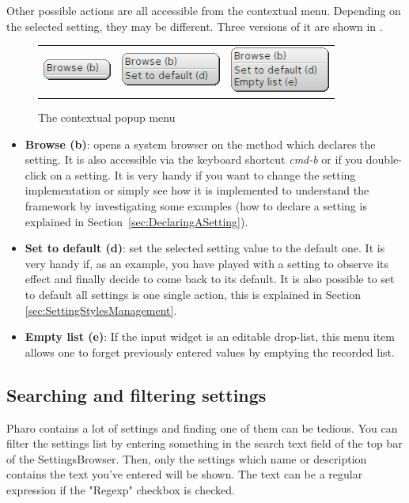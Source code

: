 \documentclass[a4paper,10pt,twoside]{book}
\begin{document}
Other possible actions are all accessible from the contextual menu.
Depending on the selected setting, they may be different. Three versions of it are shown in .
\begin{figure}[tbh]
\begin{center}
\begin{tabular}{ccc}
\includegraphics[scale=0.5]{popup0.png} & 
	\includegraphics[scale=0.5]{popup1.png} & 
	\includegraphics[scale=0.5]{popup2.png} \\ 
\end{tabular} 
\caption{The contextual popup menu}
\end{center}
\end{figure}
\begin{itemize}
\item \textbf{Browse (b)}: opens a system browser on the method which declares the setting. It is also accessible via the keyboard shortcut \textit{cmd-b} or if you double-click on a setting. It is very handy if you want to change the setting implementation or simply see how it is implemented to understand the framework by investigating some examples (how to declare a setting is explained in Section~\ref{sec:DeclaringASetting}).
\item \textbf{Set to default (d)}: set the selected setting value to the default one. It is very handy if, as an example, you have played with a setting to observe its effect and finally decide to come back to its default. It is also possible to set to default all settings is one single action, this is explained in Section \ref{sec:SettingStylesManagement}.
\item \textbf{Empty list (e)}: If the input widget is an editable drop-list, this menu item allows one to forget previously entered values by emptying the recorded list.
\end{itemize}

\subsection{Searching and filtering settings}
Pharo contains a lot of settings and finding one of them can be tedious. 
You can filter the settings list by entering something in the search text field of the top bar of the SettingsBrowser. Then, only the settings which name or description contains the text you've entered will be shown. The text can be a regular expression if the "Regexp" checkbox is checked.
\end{document}
